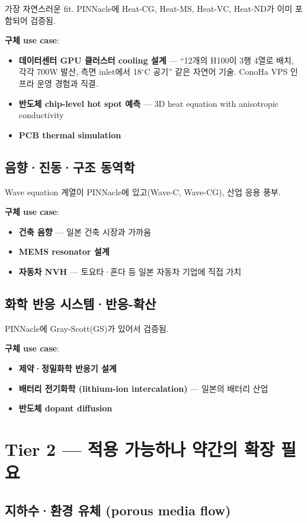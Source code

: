 \documentclass[11pt,a4paper,oneside]{report}
\begin{document}
가장 자연스러운 fit. PINNacle에 Heat-CG, Heat-MS, Heat-VC, Heat-ND가 이미 포함되어 검증됨.

\textbf{구체 use case}:
\begin{itemize}
\item \textbf{데이터센터 GPU 클러스터 cooling 설계} --- ``12개의 H100이 3행 4열로 배치, 각각 700W 발산, 측면 inlet에서 18$^\circ$C 공기'' 같은 자연어 기술. ConoHa VPS 인프라 운영 경험과 직결.
\item \textbf{반도체 chip-level hot spot 예측} --- 3D heat equation with anisotropic conductivity
\item \textbf{PCB thermal simulation}
\end{itemize}

\subsection{음향·진동·구조 동역학}

Wave equation 계열이 PINNacle에 있고(Wave-C, Wave-CG), 산업 응용 풍부.

\textbf{구체 use case}:
\begin{itemize}
\item \textbf{건축 음향} --- 일본 건축 시장과 가까움
\item \textbf{MEMS resonator 설계}
\item \textbf{자동차 NVH} --- 토요타·혼다 등 일본 자동차 기업에 직접 가치
\end{itemize}

\subsection{화학 반응 시스템·반응-확산}

PINNacle에 Gray-Scott(GS)가 있어서 검증됨.

\textbf{구체 use case}:
\begin{itemize}
\item \textbf{제약·정밀화학 반응기 설계}
\item \textbf{배터리 전기화학 (lithium-ion intercalation)} --- 일본의 배터리 산업
\item \textbf{반도체 dopant diffusion}
\end{itemize}

\section{Tier 2 --- 적용 가능하나 약간의 확장 필요}

\subsection{지하수·환경 유체 (porous media flow)}
\end{document}
